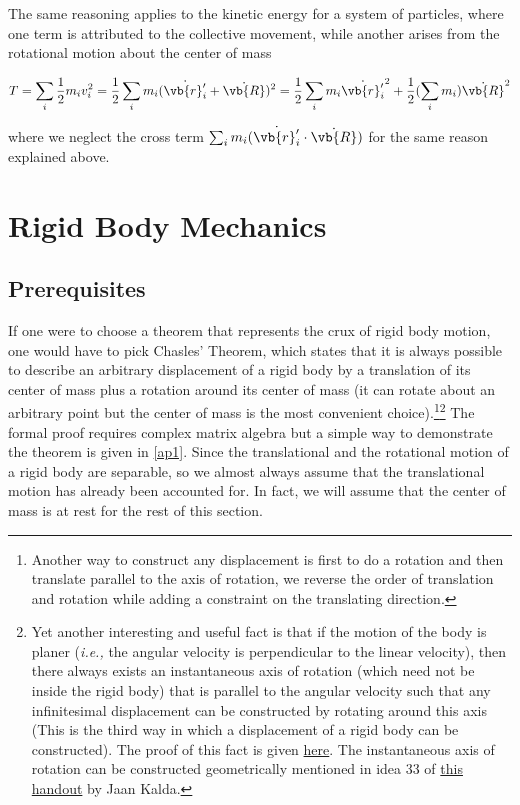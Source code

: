 \documentclass[a4paper,12pt]{report}
\begin{document}
The same reasoning applies to the kinetic energy for a system of particles, where one term is attributed to the collective movement, while another arises from the rotational motion about the center of mass

\begin{equation}
	T = \sum_{i}^{} \frac{1}{2} m_{i} v_{i} ^2 = \frac{1}{2}  \sum_{i}^{}  m_{i} (\dot{\vb{r} '_{i} } + \dot{\vb{R} } )^2 = \frac{1}{2} \sum_{i}^{} m_{i} \dot{\vb{r} '_{i} } ^2 + \frac{1}{2} (\sum_{i}^{} m_{i} ) \dot{\vb{R} } ^2  \label{T1}   
\end{equation}

where we neglect the cross term \(\sum_{i}^{} m_{i} (\dot{\vb{r} '_{i} } \cdot \dot{\vb{R} })  \) for the same reason explained above. 




\newpage
\section{Rigid Body Mechanics}
\subsection{Prerequisites}
If one were to choose a theorem that represents the crux of rigid body motion, one would have to pick Chasles' Theorem, which states that it is always possible to describe an arbitrary displacement of a rigid body by a translation of its center of mass plus a rotation around its center of mass (it can rotate about an arbitrary point but the center of mass is the most convenient choice).\footnote{Another way to construct any displacement is first to do a rotation and then translate parallel to the axis of rotation, we reverse the order of translation and rotation while adding a constraint on the translating direction.}\footnote{Yet another interesting and useful fact is that if the motion of the body is planer (\textit{i.e.,} the angular velocity is perpendicular to the linear velocity), then there always exists an instantaneous axis of rotation (which need not be inside the rigid body) that is parallel to the angular velocity such that any infinitesimal displacement can be constructed by rotating around this axis (This is the third way in which a displacement of a rigid body can be constructed). The proof of this fact is given \href{https://physics.stackexchange.com/q/541554}{here}. The instantaneous axis of rotation can be constructed geometrically mentioned in idea 33 of \href{https://www.ioc.ee/~kalda/ipho/kin_ENG.pdf}{this handout} by Jaan Kalda.}  The formal proof requires complex matrix algebra but a simple way to demonstrate the theorem is given in \cref{ap1}. Since the translational and the rotational motion of a rigid body are separable, so we almost always assume that the translational motion has already been accounted for. In fact, we will assume that the center of mass is at rest for the rest of this section.
\end{document}
